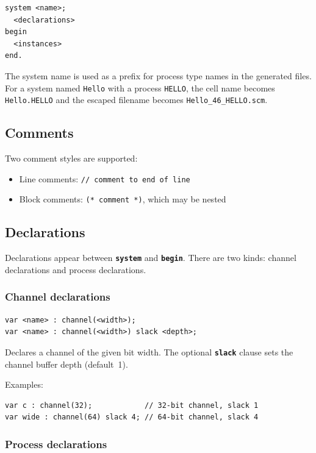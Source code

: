 \documentclass[11pt]{article}
\newcommand{\keyword}[1]{\texttt{\textbf{#1}}}
\begin{document}
\begin{Verbatim}[samepage=true]
system <name>;
  <declarations>
begin
  <instances>
end.
\end{Verbatim}

The system name is used as a prefix for process type names in the
generated files.  For a system named \texttt{Hello} with a process
\texttt{HELLO}, the cell name becomes \texttt{Hello.HELLO} and the
escaped filename becomes \texttt{Hello\_46\_HELLO.scm}.

\subsection{Comments}

Two comment styles are supported:
\begin{itemize}
\item Line comments: \verb!// comment to end of line!
\item Block comments: \verb!(* comment *)!, which may be nested
\end{itemize}

\subsection{Declarations}

Declarations appear between \keyword{system} and \keyword{begin}.
There are two kinds: channel declarations and process declarations.

\subsubsection{Channel declarations}

\begin{Verbatim}[samepage=true]
var <name> : channel(<width>);
var <name> : channel(<width>) slack <depth>;
\end{Verbatim}

Declares a channel of the given bit width.  The optional
\keyword{slack} clause sets the channel buffer depth (default~1).

Examples:
\begin{Verbatim}[samepage=true]
var c : channel(32);            // 32-bit channel, slack 1
var wide : channel(64) slack 4; // 64-bit channel, slack 4
\end{Verbatim}

\subsubsection{Process declarations}
\end{document}
